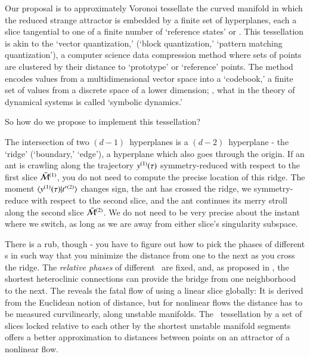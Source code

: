 Our proposal is to approximately
{Voronoi
tessellate}  the curved manifold in which the reduced strange attractor
is embedded by a finite set of hyperplanes, each a slice
tangential to one of a finite number of `reference states' or
{\template}. This tessellation is akin to the
{`vector quantization,'} (`block quantization,'  `pattern matching quantization'),
a computer science data compression method where sets of points are
clustered by their distance to `prototype' or `reference' points. The
method encodes values from a multidimensional vector space into a
`codebook,' a finite set of values from a discrete space of a lower
dimension; \ie, what in the theory of dynamical systems is called
`symbolic dynamics.'

So how do we propose to implement this tessellation?

The intersection of two $(d\!-\!1)$\dmn\ hyperplanes  is
a $(d\!-\!2)$\dmn\ hyperplane - the `ridge' (`boundary,' `edge'), a
hyperplane which also goes through the origin.
If an ant is crawling
along the trajectory $y{}^{(1)}(\tau)$ symmetry-reduced with
respect to the first slice $\bar{\cal M}{}^{(1)}$, you do not need to compute
the precise location of this ridge. The moment
$\braket{\sspRed{}^{(1)}(\tau)}{\sliceTan{}{}^{(2)}}$ changes sign, the
ant has crossed the ridge, we symmetry-reduce with respect to the second
slice, and the ant continues its merry stroll along the second slice
$\bar{\cal M}{}^{(2)}$. We do not need to be very precise about the instant
where we switch, as long as we are away from either slice's singularity
subspace.

There is a rub, though - you have to figure out how to pick the phases of
different {\template s} in such way that you minimize the distance from
one to the next as you cross the ridge. The {\em relative phases} of
different \reqva\ are fixed, and, as proposed in , the
shortest heteroclinic connections can provide the bridge from one
neighborhood to the next. The reveals the fatal flow of using a linear
slice globally: It is derived from the Euclidean notion of distance, but
for nonlinear flows the distance has to be measured curvilinearly, along
unstable manifolds. The \reducedsp\
tessellation by a set of slices locked relative to each other by the
shortest unstable manifold segments offers a better approximation to
distances between points on an attractor of a nonlinear flow.

